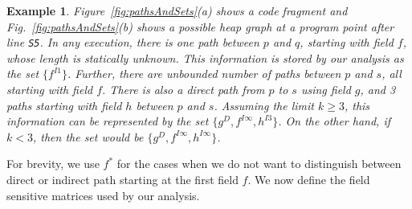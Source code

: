 \documentclass{sig-alternate}
\newtheorem{example}{Example}
\newcommand{\p}{\ensuremath{p}}
\newcommand{\q}{\ensuremath{q}}
\newcommand{\s}{\ensuremath{s}}
\newcommand{\drct}{\ensuremath{D}}
\newcommand{\indrct}{\ensuremath{I}}
\newcommand{\fieldI}[3]{\ensuremath{{#1}_{#2}^{\indrct#3}}}
\begin{document}
\begin{example}
{ 

Figure~\ref{fig:pathsAndSets}(a) shows a code fragment and
Fig.~\ref{fig:pathsAndSets}(b) shows a possible heap graph
at a program point after line {\tt S5}. In any execution, there is one path
between $\p$ and $\q$, starting with field $f$, whose
length is statically unknown. This information is stored by
our analysis as the set $\{\fieldI{f}{}{1}\}$. Further, there are
unbounded number of paths between $\p$ and $\s$, all
starting with field $f$. There is also a direct path from
$\p$ to $\s$ using field $g$, and 3 paths starting with
field $h$ between $\p$ and $\s$. Assuming the limit $k
\geq 3$, this information can be represented by the set $\{
g^\drct, f^{\indrct\infty}, h^{\indrct 3} \}$. On the other hand, if $k < 3$,
then the set would be $\{ g^\drct, f^{\indrct\infty}, h^{\indrct\infty} \}$.
  } \hfill\psframebox{}
\end{example}

\newcommand{\anysup}{\ensuremath{\ast}} For brevity, we use
$f^{\anysup}$ for the cases when we do not want to
distinguish between direct or indirect path starting at the
first field $f$. We now define the field sensitive matrices
used by our analysis.
\end{document}
